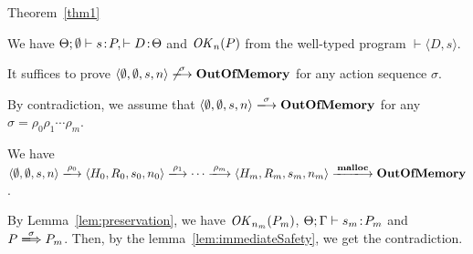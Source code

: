\begin{pfof}{Theorem~\ref{thm1}}


We have \( \Theta;\emptyset \vdash s\!:\! P, \vdash D\!:\! \Theta\) and
\(\mathit{OK}_n(P)\) from the well-typed program \(\vdash \langle D,
s\rangle\).

It suffices to prove \( \langle \emptyset, \emptyset, s, n\rangle
\not\xlongrightarrow{\sigma} \OVERFLOW\) for any action sequence
\(\sigma\).

By contradiction, we assume that \( \langle \emptyset, \emptyset,
s, n\rangle \xlongrightarrow{\sigma} \OVERFLOW \) for any \(\sigma =
\rho_0\rho_1\cdots\rho_m\).

We have \( \langle \emptyset, \emptyset, s, n\rangle
\xlongrightarrow{\rho_0} \langle H_0, R_0, s_0, n_0\rangle
\xlongrightarrow{\rho_1} \cdots \xlongrightarrow{\rho_m} \langle H_m,
R_m, s_m, n_m \rangle \xlongrightarrow{\Malloc} \OVERFLOW \).

By Lemma~\ref{lem:preservation}, we have \(\mathit{OK}_{n_m}(P_m)\),
\(\Theta;\Gamma\vdash s_m \!:\! P_m\) and \(P \xLongrightarrow{\sigma}
P_m\). Then, by the lemma~\ref{lem:immediateSafety}, we get the
contradiction.

\end{pfof}
